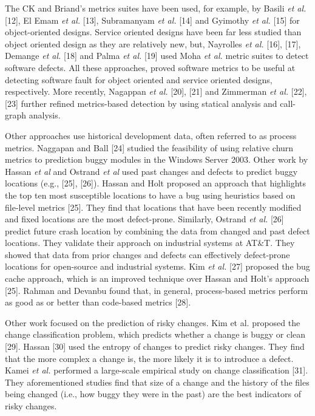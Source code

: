 \documentclass[conference]{IEEEtran}
\begin{document}
The CK and Briand's metrics suites have been used, for example, by
Basili \emph{et al.} {[}12{]}, El Emam \emph{et al.} {[}13{]},
Subramanyam \emph{et al.} {[}14{]} and Gyimothy \emph{et al.} {[}15{]}
for object-oriented designs. Service oriented designs have been far less
studied than object oriented design as they are relatively new, but,
Nayrolles \emph{et al.} {[}16{]}, {[}17{]}, Demange \emph{et al.}
{[}18{]} and Palma \emph{et al.} {[}19{]} used Moha \emph{et al.} metric
suites to detect software defects. All these approaches, proved software
metrics to be useful at detecting software fault for object oriented and
service oriented designs, respectively. More recently, Nagappan \emph{et
al.} {[}20{]}, {[}21{]} and Zimmerman \emph{et al.} {[}22{]}, {[}23{]}
further refined metrics-based detection by using statical analysis and
call-graph analysis.

Other approaches use historical development data, often referred to as
process metrics. Naggapan and Ball {[}24{]} studied the feasibility of
using relative churn metrics to prediction buggy modules in the Windows
Server 2003. Other work by Hassan \emph{et al} and Ostrand \emph{et al}
used past changes and defects to predict buggy locations (e.g.,
{[}25{]}, {[}26{]}). Hassan and Holt proposed an approach that
highlights the top ten most susceptible locations to have a bug using
heuristics based on file-level metrics {[}25{]}. They find that
locations that have been recently modified and fixed locations are the
most defect-prone. Similarly, Ostrand \emph{et al.} {[}26{]} predict
future crash location by combining the data from changed and past defect
locations. They validate their approach on industrial systems at AT\&T.
They showed that data from prior changes and defects can effectively
defect-prone locations for open-source and industrial systems. Kim
\emph{et al.} {[}27{]} proposed the bug cache approach, which is an
improved technique over Hassan and Holt's approach {[}25{]}. Rahman and
Devanbu found that, in general, process-based metrics perform as good as
or better than code-based metrics {[}28{]}.

Other work focused on the prediction of risky changes. Kim et al.
proposed the change classification problem, which predicts whether a
change is buggy or clean {[}29{]}. Hassan {[}30{]} used the entropy of
changes to predict risky changes. They find that the more complex a
change is, the more likely it is to introduce a defect. Kamei \emph{et
al.} performed a large-scale empirical study on change classification
{[}31{]}. They aforementioned studies find that size of a change and the
history of the files being changed (i.e., how buggy they were in the
past) are the best indicators of risky changes.
\end{document}
